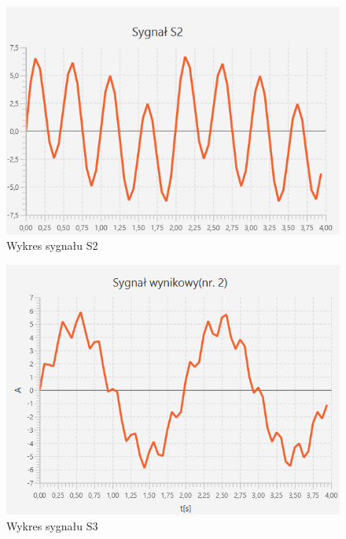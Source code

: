 \documentclass[12pt]{article}
\begin{document}
\begin{figure}[H]
	\centering
	\includegraphics[width=\linewidth]{S2.png}
	\caption{Wykres sygnału S2}
	\label{S2_sygnal}
\end{figure}


\begin{figure}[H]
	\centering
	\includegraphics[width=\linewidth]{S3.png}
	\caption{Wykres sygnału S3}
	\label{S3_sygnal}
\end{figure}
\end{document}
